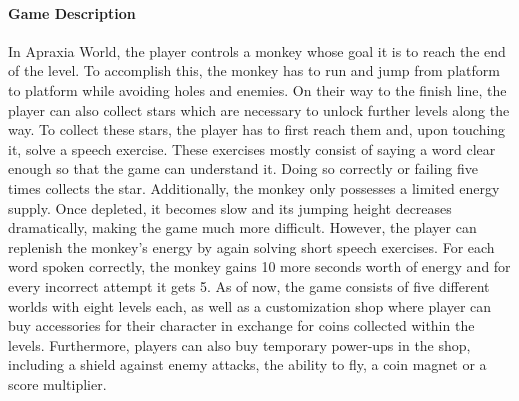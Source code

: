\documentclass[draft,final]{vutinfth} %
\begin{document}
\paragraph{Game Description}
In Apraxia World, the player controls a monkey whose goal it is to reach the end of the level. To accomplish this, the monkey has to run and jump from platform to platform while avoiding holes and enemies. On their way to the finish line, the player can also collect stars which are necessary to unlock further levels along the way. To collect these stars, the player has to first reach them and, upon touching it, solve a speech exercise. These exercises mostly consist of saying a word clear enough so that the game can understand it. Doing so correctly or failing five times collects the star.
Additionally, the monkey only possesses a limited energy supply. Once depleted, it becomes slow and its jumping height decreases dramatically, making the game much more difficult. However, the player can replenish the monkey's energy by again solving short speech exercises. For each word spoken correctly, the monkey gains 10 more seconds worth of energy and for every incorrect attempt it gets 5.
As of now, the game consists of five different worlds with eight levels each, as well as a customization shop where player can buy accessories for their character in exchange for coins collected within the levels. Furthermore, players can also buy temporary power-ups in the shop, including a shield against enemy attacks, the ability to fly, a coin magnet or a score multiplier.
\end{document}
